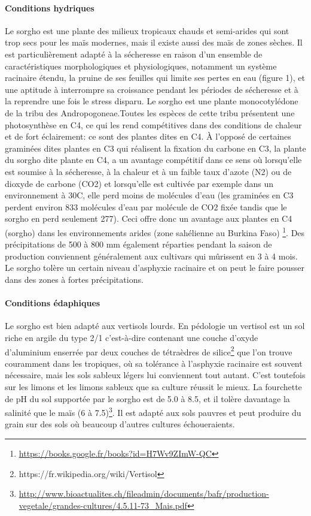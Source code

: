 \documentclass[a4paper,11pt]{article}
\begin{document}
\paragraph{Conditions hydriques} Le sorgho est une plante des milieux
tropicaux chauds et semi-arides qui sont trop secs pour les maïs
modernes, mais il existe aussi des maïs de zones sèches. Il est
particulièrement adapté à la sécheresse en raison d’un ensemble de
caractéristiques morphologiques et physiologiques, notamment un
système racinaire étendu, la pruine de ses feuilles qui limite ses
pertes en eau (figure 1), et une aptitude à interrompre sa croissance
pendant les périodes de sécheresse et à la reprendre une fois le
stress disparu. Le sorgho est une plante monocotylédone de la tribu
des Andropogoneae.Toutes les espèces de cette tribu présentent une
photosynthèse en C4, ce qui les rend compétitives dans des conditions
de chaleur et de fort éclairement: ce sont des plantes dites en C4. À
l’opposé de certaines graminées dites plantes en C3 qui réalisent la
fixation du carbone en C3, la plante du sorgho dite plante en C4, a un
avantage compétitif dans ce sens où lorsqu’elle est soumise à la
sécheresse, à la chaleur et à un faible taux d’azote (N2) ou de
dioxyde de carbone (CO2) et lorsqu’elle est cultivée par exemple dans
un environnement à 30\degree{}C, elle perd moins de molécules d’eau
(les graminées en C3 perdent environ 833 molécules d’eau par molécule
de CO2 fixée tandis que le sorgho en perd seulement 277). Ceci offre
donc un avantage aux plantes en C4 (sorgho) dans les environnements
arides (zone sahélienne au Burkina Faso)
\footnote{\url{https://books.google.fr/books?id=H7Wv9ZImW-QC}}. Des
 précipitations de 500 à 800 mm également réparties pendant la saison
 de production conviennent généralement aux cultivars qui mûrissent
 en 3 à 4 mois. Le sorgho tolère un certain niveau d’asphyxie
 racinaire et on peut le faire pousser dans des zones à fortes
 précipitations\cite{BARRO_KONDOMBO_2010}.

 
\paragraph{Conditions édaphiques}
Le sorgho est bien adapté aux vertisols lourds. En pédologie un
vertisol est un sol riche en argile du type 2/1 c’est-à-dire contenant
une couche d’oxyde d’aluminium enserrée par deux couches de tétraèdres
de silice\footnote{https://fr.wikipedia.org/wiki/Vertisol} que l’on
trouve couramment dans les tropiques, où sa tolérance à l’asphyxie
racinaire est souvent nécessaire, mais les sols sableux légers lui
conviennent tout autant. C’est toutefois sur les limons et les limons
sableux que sa culture réussit le mieux. La fourchette de pH du sol
supportée par le sorgho est de 5.0 à 8.5, et il tolère davantage la
salinité que le maïs (6 à 7.5)\footnote{\url{http://www.bioactualites.ch/fileadmin/documents/bafr/production-vegetale/grandes-cultures/4.5.11-73_Mais.pdf}}. Il
est adapté aux sols pauvres et peut produire du grain sur des sols où
beaucoup d’autres cultures échoueraients\cite{BARRO_KONDOMBO_2010}.
 
\end{document}

